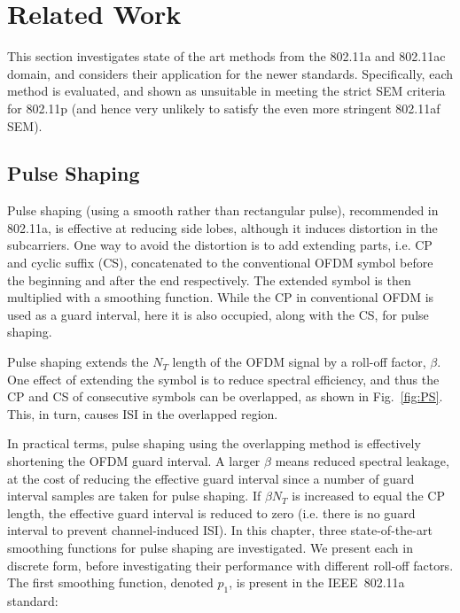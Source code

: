 \section{Related Work}

This section investigates state of the art methods from the 802.11a and 802.11ac domain, and considers their application for the newer standards.
Specifically, each method is evaluated, and shown as unsuitable in meeting the strict SEM criteria for 802.11p (and hence very unlikely to satisfy the even more stringent 802.11af SEM).

\subsection{Pulse Shaping}
\label{subsec:Pulse}
Pulse shaping (using a smooth rather than rectangular pulse), recommended in 802.11a, is effective at reducing side lobes, although it induces distortion in the subcarriers.
One way to avoid the distortion is to add extending parts, i.e. CP and cyclic suffix (CS), concatenated to the conventional OFDM symbol before the beginning and after the end respectively. The extended symbol is then multiplied with a smoothing function.
While the CP in conventional OFDM is used as a guard interval, here it is also occupied, along with the CS, for pulse shaping.

Pulse shaping extends the  $N_{T}$ length of the OFDM signal by a roll-off factor, $\beta$.
One effect of extending the symbol is to reduce spectral efficiency, and thus the CP and CS of consecutive symbols can be overlapped, as shown in Fig.~\ref{fig:PS}. This, in turn, causes ISI in the overlapped region.

In practical terms, pulse shaping using the overlapping method is effectively shortening the OFDM guard interval.
A larger $\beta$ means reduced spectral leakage, at the cost of reducing the effective guard interval since a number of guard interval samples are taken for pulse shaping.
If $\beta N_{T}$ is increased to equal the CP length, the effective guard interval is reduced to zero (i.e. there is no guard interval to prevent channel-induced ISI).
In this chapter, three state-of-the-art smoothing functions for pulse shaping are investigated. We present each in discrete form, before investigating their performance with different roll-off factors.
The first smoothing function, denoted $p_1$, is present in the IEEE~802.11a standard:

